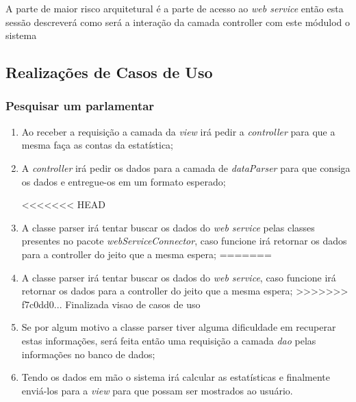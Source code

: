 A parte de maior risco arquitetural é a parte de acesso ao \textit{web service} então esta sessão descreverá como será a interação da camada controller com este módulod o sistema

\subsection{Realizações de Casos de Uso}
	
	\subsubsection{Pesquisar um parlamentar}

		\begin{enumerate}
			\item Ao receber a requisição a camada da \textit{view} irá pedir a \textit{controller} para que a mesma faça as contas da estatística;

			\item A \textit{controller} irá pedir os dados para a camada de \textit{dataParser} para que consiga os dados e entregue-os em um formato esperado;

<<<<<<< HEAD
			\item A classe parser irá tentar buscar os dados do \textit{web service} pelas classes presentes no pacote \textit{webServiceConnector}, caso funcione irá retornar os dados para a controller do jeito que a mesma espera;
=======
			\item A classe parser irá tentar buscar os dados do \textit{web service}, caso funcione irá retornar os dados para a controller do jeito que a mesma espera;
>>>>>>> f7c0dd0... Finalizada visao de casos de uso

			\item Se por algum motivo a classe parser tiver alguma dificuldade em recuperar estas informações, será feita então uma requisição a camada \textit{dao} pelas informações no banco de dados;

			\item Tendo os dados em mão o sistema irá calcular as estatísticas e finalmente enviá-los para a \textit{view} para que possam ser mostrados ao usuário.
		\end{enumerate}